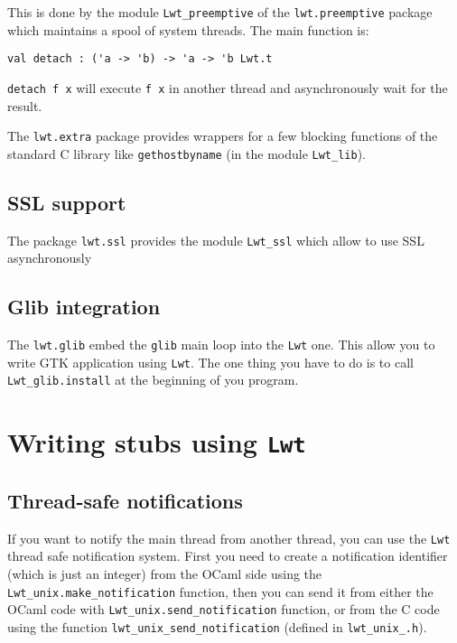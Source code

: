 This is done by the module {\tt Lwt\_preemptive} of the
{\tt lwt.preemptive} package which maintains a spool of system
threads. The main function is:



\lstset{language=[Objective]Caml}\begin{lstlisting}
val detach : ('a -> 'b) -> 'a -> 'b Lwt.t

\end{lstlisting}
{\tt detach f x} will execute {\tt f x} in another thread and
asynchronously wait for the result.



The {\tt lwt.extra} package provides wrappers for a few blocking
functions of the standard C library like {\tt gethostbyname} (in
the module {\tt Lwt\_lib}).



\subsection{ SSL support }

The package {\tt lwt.ssl} provides the module {\tt Lwt\_ssl}
which allow to use SSL asynchronously



\subsection{ Glib integration }

The {\tt lwt.glib} embed the {\tt glib} main loop into the
{\tt Lwt} one. This allow you to write GTK application using {\tt Lwt}.  The
one thing you have to do is to call {\tt Lwt\_glib.install} at
the beginning of you program.



\section{ Writing stubs using {\tt Lwt} }

\subsection{ Thread-safe notifications }

If you want to notify the main thread from another thread, you can use the {\tt Lwt}
thread safe notification system. First you need to create a notification identifier
(which is just an integer) from the OCaml side using the
{\tt Lwt\_unix.make\_notification} function, then you can send it from either the
OCaml code with {\tt Lwt\_unix.send\_notification} function, or from the C code using
the function {\tt lwt\_unix\_send\_notification} (defined in {\tt lwt\_unix\_.h}).



